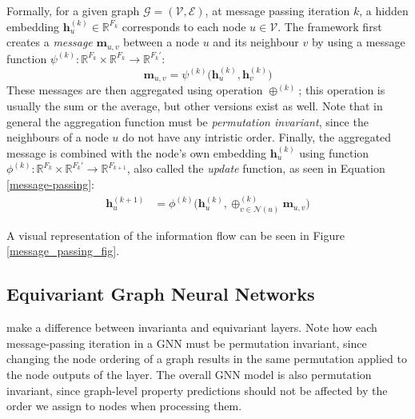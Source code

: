 Formally, for a given graph $\mathcal{G} = (\mathcal{V}, \mathcal{E})$, at message passing iteration $k$, a hidden embedding $\textbf{h}_u^{(k)} \in \mathbb{R}^{F_k}$ corresponds to each node $u \in \mathcal{V}$. 
The framework first creates a \textit{message} $\mathbf{m}_{u,v}$ between a node $u$ and its neighbour $v$ by using a message function $\psi^{(k)}: \mathbb{R}^{F_k}\times\mathbb{R}^{F_k} \rightarrow \mathbb{R}^{F_{k}'}$:
\begin{equation}
    \mathbf{m}_{u, v} = \psi^{(k)}\Big(\textbf{h}_{u}^{(k)}, \textbf{h}_v^{(k)}\Big)
\end{equation}
These messages are then aggregated using operation $\oplus^{(k)}$; 
this operation is usually the sum or the average, but other versions exist as well. Note that in general the aggregation function must be \textit{permutation invariant}, since the neighbours of a node $u$ do not have any intristic order.
Finally, the aggregated message is combined with the node's own embedding $\mathbf{h}_u^{(k)}$ using function $\phi^{(k)}:\mathbb{R}^{F_k} \times \mathbb{R}^{F_{k}'} \rightarrow \mathbb{R}^{F_{k+1}}$, also called the \textit{update} function, as seen in Equation \ref{message-passing}:
\begin{align}
    \textbf{h}_u^{(k+1)} &= \phi^{(k)}\Big(\textbf{h}_u^{(k)}, \oplus_{v\in \mathcal{N}(u)}^{(k)}\mathbf{m}_{u,v}\Big)
\label{message-passing}
\end{align}

A visual representation of the information flow can be seen in Figure \ref{message_passing_fig}.

\subsection{Equivariant Graph Neural Networks}
{\color{red} make a difference between invarianta and equivariant layers. }Note how each message-passing iteration in a GNN must be permutation invariant, since changing the node ordering of a graph results in the same permutation applied to the node outputs of the layer. 
The overall GNN model is also permutation invariant, since graph-level property predictions should not be affected by the order we assign to nodes when processing them.

